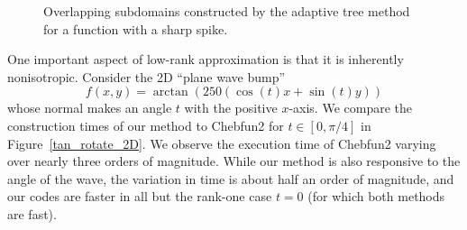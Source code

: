 \begin{figure}
  \centering
  \caption{Overlapping subdomains constructed by the adaptive tree method for a function with a sharp spike.}
  \label{rungeFUN1}
\end{figure}


One important aspect of low-rank approximation is that it is inherently nonisotropic. Consider the 2D ``plane wave bump'' 
\begin{equation}
f(x,y)=\arctan(250(\cos(t)x+\sin(t)y))
\label{rotate_func_2D}	
\end{equation}
whose normal makes an angle $t$ with the positive $x$-axis. We compare the construction times of our method to Chebfun2 for $t \in [0,\pi/4]$ in Figure~\ref{tan_rotate_2D}. We observe the execution time of Chebfun2 varying over nearly three orders of magnitude. While our method is also responsive to the angle of the wave, the variation in time is about half an order of magnitude, and our codes are faster in all but the rank-one case $t=0$ (for which both methods are fast). 


